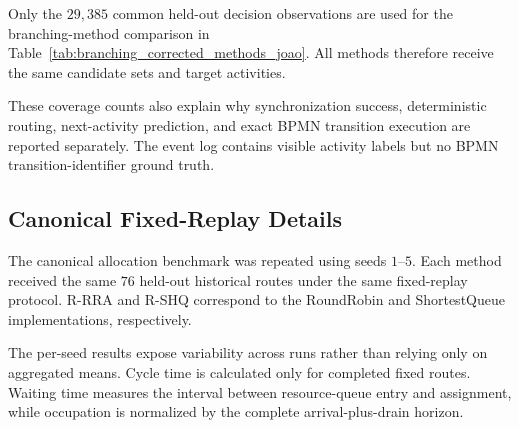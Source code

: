 Only the $29{,}385$ common held-out decision observations are used for the
branching-method comparison in
Table~\ref{tab:branching_corrected_methods_joao}. All methods therefore receive
the same candidate sets and target activities.

These coverage counts also explain why synchronization success, deterministic
routing, next-activity prediction, and exact BPMN transition execution are
reported separately. The event log contains visible activity labels but no
BPMN transition-identifier ground truth.


\subsection{Canonical Fixed-Replay Details}
\label{app:joao-fixed-replay-details}

The canonical allocation benchmark was repeated using seeds $1$--$5$. Each
method received the same $76$ held-out historical routes under the same
fixed-replay protocol. R-RRA and R-SHQ correspond to the RoundRobin and
ShortestQueue implementations, respectively.

The per-seed results expose variability across runs rather than relying only on
aggregated means. Cycle time is calculated only for completed fixed routes.
Waiting time measures the interval between resource-queue entry and assignment,
while occupation is normalized by the complete arrival-plus-drain horizon.

